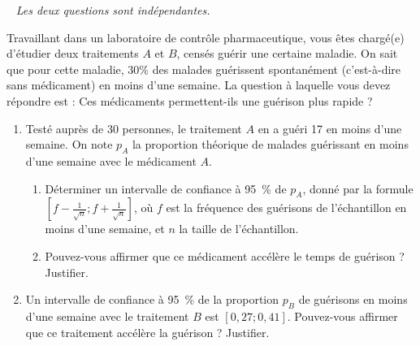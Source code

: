 \documentclass[12pt]{article}
\begin{document}
\begin{exercice}~
  \noindent\emph{Les deux questions sont indépendantes.}

  Travaillant dans un laboratoire de contrôle pharmaceutique, vous êtes chargé(e) d'étudier deux traitements $A$ et $B$, censés guérir une certaine maladie. On sait que pour cette maladie, 30\% des malades guérissent spontanément (c'est-à-dire sans médicament) en moins d'une semaine. La question à laquelle vous devez répondre est : Ces médicaments permettent-ils une guérison plus rapide ?

  \begin{enumerate}
    \item Testé auprès de 30 personnes, le traitement $A$ en a guéri 17 en moins d'une semaine. On note $p_A$ la proportion théorique de malades guérissant en moins d'une semaine avec le médicament $A$.
      \begin{enumerate}
        \item Déterminer un intervalle de confiance à 95~\% de $p_A$, donné par la formule $\left[f-\frac{1}{\sqrt{n}};f+\frac{1}{\sqrt{n}}\right]$, où $f$ est la fréquence des guérisons de l'échantillon en moins d'une semaine, et $n$ la taille de l'échantillon.
        \item Pouvez-vous affirmer que ce médicament accélère le temps de guérison ? Justifier.
      \end{enumerate}
    \item Un intervalle de confiance à 95~\% de la proportion $p_B$ de guérisons en moins d'une semaine avec le traitement $B$ est $\left[0,27;0,41\right]$. Pouvez-vous affirmer que ce traitement accélère la guérison ? Justifier.
  \end{enumerate}
\end{exercice}
\end{document}
